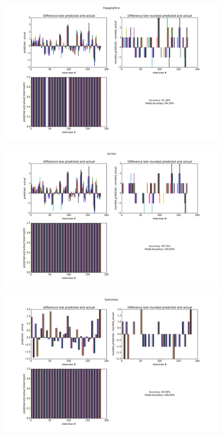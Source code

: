 \documentclass[11pt]{article}
\begin{document}
\begin{figure}[H]
\begin{center}
\includegraphics[width=1\columnwidth]{figures2/EngagingTone.png}
\end{center}
\end{figure}

\begin{figure}[H]
\begin{center}
\includegraphics[width=1\columnwidth]{figures2/Excited.png}
\end{center}
\end{figure}

\begin{figure}[H]
\begin{center}
\includegraphics[width=1\columnwidth]{figures2/EyeContact.png}
\end{center}
\end{figure}
\end{document}
